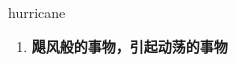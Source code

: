 
\begin{frame}
{\huge hurricane}
\begin{center}
\begin{enumerate}\Large
  \item \textbf{飓风般的事物，引起动荡的事物}
\end{enumerate}
\end{center}
\end{frame}
